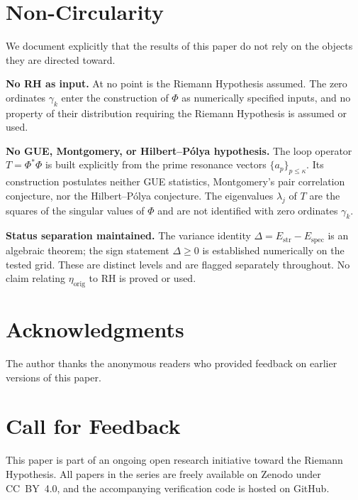 \documentclass[11pt]{article}
\newcommand{\Estr}{E_{\mathrm{str}}}
\newcommand{\Espec}{E_{\mathrm{spec}}}
\newcommand{\etaorig}{\eta_{\mathrm{orig}}}
\begin{document}
\section*{Non-Circularity}
\label{sec:nocirc}

We document explicitly that the results of this paper do not rely on
the objects they are directed toward.

\textbf{No RH as input.}
At no point is the Riemann Hypothesis assumed.
The zero ordinates $\gamma_k$ enter the construction of $\Phi$ as
numerically specified inputs, and no property of their distribution
requiring the Riemann Hypothesis is assumed or used.

\textbf{No GUE, Montgomery, or Hilbert--P\'olya hypothesis.}
The loop operator $T=\Phi^*\Phi$ is built explicitly from the prime
resonance vectors $\{a_p\}_{p\le\kappa}$. Its construction postulates
neither GUE statistics, Montgomery's pair correlation conjecture, nor
the Hilbert--P\'olya conjecture. The eigenvalues $\lambda_j$ of $T$ are
the squares of the singular values of $\Phi$ and are not identified
with zero ordinates $\gamma_k$.

\textbf{Status separation maintained.}
The variance identity $\Delta=\Estr-\Espec$ is an algebraic theorem;
the sign statement $\Delta\geq 0$ is established numerically on the
tested grid. These are distinct levels and are flagged separately
throughout. No claim relating $\etaorig$ to RH is proved or used.

\section*{Acknowledgments}

The author thanks the anonymous readers who provided feedback on
earlier versions of this paper.

\section*{Call for Feedback}

This paper is part of an ongoing open research initiative toward the
Riemann Hypothesis.
All papers in the series are freely available on Zenodo under CC~BY~4.0,
and the accompanying verification code is hosted on GitHub.
\end{document}
